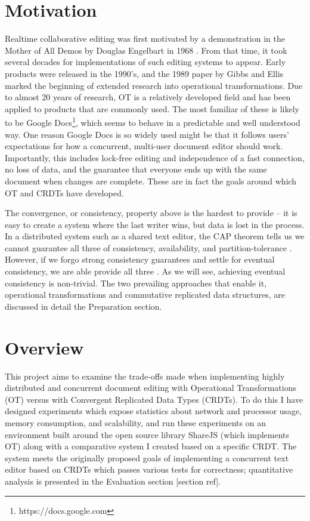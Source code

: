 \documentclass[12pt,a4paper,twoside,openright]{report}
\begin{document}
\section{Motivation}

Realtime collaborative editing was first motivated by a demonstration in the Mother of All Demos by Douglas Engelbart in 1968 \cite{MotherDemo}. From that time, it took several decades for implementations of such editing systems to appear. Early products were released in the 1990's, and the 1989 paper by Gibbs and Ellis \cite{Ellis1989} marked the beginning of extended research into operational transformations. Due to almost 20 years of research, OT is a relatively developed field and has been applied to products that are commonly used. The most familiar of these is likely to be Google Docs\footnote{https://docs.google.com}, which seems to behave in a predictable and well understood way. One reason Google Docs is so widely used might be that it follows users' expectations for how a concurrent, multi-user document editor should work. Importantly, this includes lock-free editing and independence of a fast connection, no loss of data, and the guarantee that everyone ends up with the same document when changes are complete. These are in fact the goals around which OT and CRDTs have developed.

The convergence, or consistency, property above is the hardest to provide -- it is easy to create a system where the last writer wins, but data is lost in the process. In a distributed system such as a shared text editor, the CAP theorem tells us we cannot guarantee all three of consistency, availability, and partition-tolerance \cite{Gilbert2005}. However, if we forgo strong consistency guarantees and settle for eventual consistency, we are able provide all three \cite{zeller2014}. As we will see, achieving eventual consistency is non-trivial. The two prevailing approaches that enable it, operational transformations and commutative replicated data structures, are discussed in detail the Preparation section.


\section{Overview}
This project aims to examine the trade-offs made when implementing highly distributed and concurrent document editing with Operational Transformations (OT) versus with Convergent Replicated Data Types (CRDTs). To do this I have designed experiments which expose statistics about network and processor usage, memory consumption, and scalability, and run these experiments on an environment built around the open source library ShareJS (which implements OT) along with a comparative system I created based on a specific CRDT. The system meets the originally proposed goals of implementing a concurrent text editor based on CRDTs which passes various tests for correctness; quantitative analysis is presented in the Evaluation section [section ref].
\end{document}
